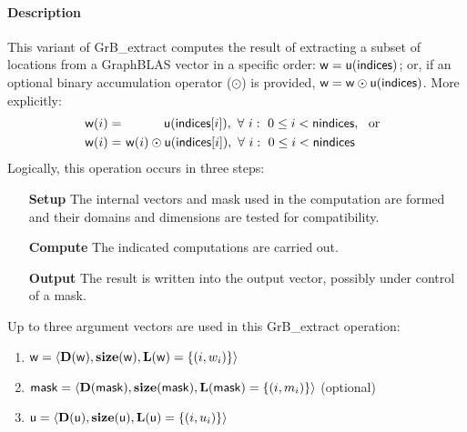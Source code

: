 \paragraph{Description}

This variant of {\sf GrB\_extract} computes the result of extracting a subset of
locations from a GraphBLAS vector in a specific order: 
${\sf w} = {\sf u}({\sf indices})$; or, if an optional binary accumulation 
operator ($\odot$) is provided, ${\sf w} = {\sf w} \odot {\sf u}({\sf indices})$.  
More explicitly:
\[
\begin{aligned}
    {\sf w}(i) = &\ \ \ \ \ \ \ \ \ \ {\sf u}({\sf indices}[i]),
    \ \forall \ i : \ 0 \leq i < {\sf nindices}, \mbox{~~or~~}
    \\
    {\sf w}(i) = &\ {\sf w}(i) \odot {\sf u}({\sf indices}[i]),
    \ \forall \ i : \ 0 \leq i < {\sf nindices}
\end{aligned}
\]
Logically, this operation occurs in three steps:
\begin{enumerate}[leftmargin=0.75in]
\item[\bf Setup] The internal vectors and mask used in the computation are formed 
and their domains and dimensions are tested for compatibility.
\item[\bf Compute] The indicated computations are carried out.
\item[\bf Output] The result is written into the output vector, possibly under 
control of a mask.
\end{enumerate}

Up to three argument vectors are used in this {\sf GrB\_extract} operation:
\begin{enumerate}
	\item ${\sf w} = \langle \bold{D}({\sf w}),\bold{size}({\sf w}),
    \bold{L}({\sf w}) = \{(i,w_i) \} \rangle$

	\item ${\sf mask} = \langle \bold{D}({\sf mask}),\bold{size}({\sf mask}),
    \bold{L}({\sf mask}) = \{(i,m_i) \} \rangle$ (optional)

	\item ${\sf u} = \langle \bold{D}({\sf u}),\bold{size}({\sf u}),
    \bold{L}({\sf u}) = \{(i,u_i) \} \rangle$
\end{enumerate}

